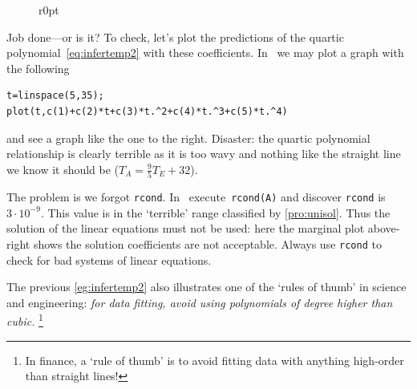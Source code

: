 \begin{example}
\begin{solution}
\begin{figure}[7]r{0pt}
\end{figure}
Job done---or is it?
To check, let's plot the predictions of the quartic polynomial~\eqref{eq:infertemp2} with these coefficients.
In \script\ we may plot a graph with the following
\setbox\ajrqrbox\hbox{}%
\marginajrbox%
\begin{verbatim}
t=linspace(5,35);
plot(t,c(1)+c(2)*t+c(3)*t.^2+c(4)*t.^3+c(5)*t.^4)
\end{verbatim}
and see a graph like the one to the right.
Disaster: the quartic polynomial relationship is clearly terrible as it is too wavy and nothing like the straight line we know it should be (\(T_A=\frac95T_E+32\)).

The problem is we forgot \verb|rcond|.
In \script\ execute~\verb|rcond(A)| and discover \verb|rcond| is \(3\cdot10^{-9}\).
This value is in the `terrible' range classified by \cref{pro:unisol}.
Thus the solution of the linear equations must not be used: here the marginal plot above-right shows the solution coefficients are not acceptable.
Always use \verb|rcond| to check for bad systems of linear equations.
\aqed\par
\end{solution}
\end{example}

The previous \cref{eg:infertemp2} also illustrates one of the `rules of thumb' in science and engineering: \emph{for data fitting, avoid using polynomials of degree higher than cubic.}%
\footnote{In finance, a `rule of thumb' is to avoid fitting data with anything high-order than straight lines!}


